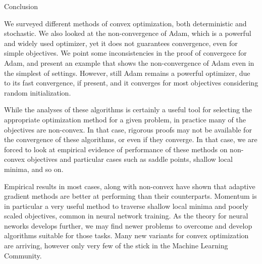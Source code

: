 \documentclass{article}
\begin{document}
\begin{psection}{Conclusion}

	We surveyed different methods of convex optimization, both deterministic and stochastic. We also looked at the non-convergence of Adam, which is a powerful and widely used optimizer, yet it does not guarantees convergence, even for simple objectives. We point some inconsistencies in the proof of convergece for Adam, and present an example that shows the non-convergence of Adam even in the simplest of settings. However, still Adam remains a powerful optimizer, due to its fast convergence, if present, and it converges for most objectives considering random initialization.

	While the analyses of these algorithms is certainly a useful tool for selecting the appropriate optimization method for a given problem, in practice many of the objectives are non-convex. In that case, rigorous proofs may not be available for the convergence of these algorithms, or even if they converge. In that case, we are forced to look at empirical evidence of performance of these methods on non-convex objectives and particular cases such as saddle points, shallow local minima, and so on.

	Empirical results in most cases, along with non-convex have shown that adaptive gradient methods are better at performing than their counterparts. Momentum is in particular a very useful method to traverse shallow local minima and poorly scaled objectives, common in neural network training. As the theory for neural neworks develops further, we may find newer problems to overcome and develop algorithms suitable for those tasks. Many new variants for convex optimization are arriving, however only very few of the stick in the Machine Learning Community.

\end{psection}



\end{document}
